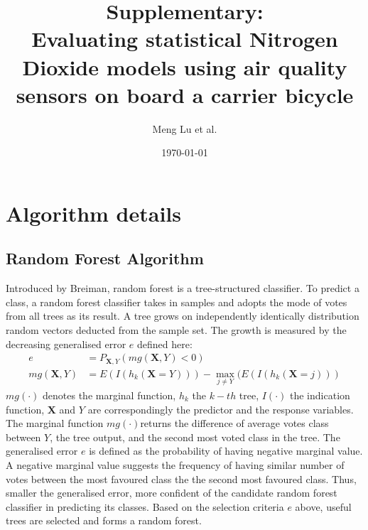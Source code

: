 \documentclass{article}
\title{Supplementary:\\ Evaluating statistical Nitrogen Dioxide models using air quality sensors on board a carrier bicycle}
\author{Meng Lu et al. }
\date{\today}
\begin{document}
\maketitle

\section{Algorithm details}



\subsection{Random Forest Algorithm}
Introduced by Breiman\citep{breiman2001random}, random forest is a tree-structured classifier. To predict a class, a random forest classifier takes in samples and adopts the mode of votes from all trees as its result. A tree grows on independently identically distribution random vectors deducted from the sample set. The growth is measured by the decreasing generalised error $e$ defined here:
\begin{align}
    e &= P_{\boldsymbol X, Y}(mg(\boldsymbol X, Y)<0)\\
    mg(\boldsymbol X, Y) &= E (I(h_{k}(\boldsymbol{X} = Y))) -\max_{j\neq Y}(E(I(h_{k}(\boldsymbol X= j)))
\end{align}
$mg(\cdot)$ denotes the marginal function, $h_k$ the $k-th$ tree, $I(\cdot)$ the indication function, $\boldsymbol X$ and $Y$ are correspondingly the predictor and the response variables. The marginal function $mg(\cdot)$returns the difference of average votes class between $Y$, the tree output, and the second most voted class in the tree. The generalised error $e$ is defined as the probability of having negative marginal value. A negative marginal value suggests the frequency of having similar number of votes between the most favoured class the the second most favoured class. Thus, smaller the generalised error, more confident of the candidate random forest classifier in predicting its classes. Based on the selection criteria $e$ above, useful trees are selected and forms a random forest.
\end{document}
